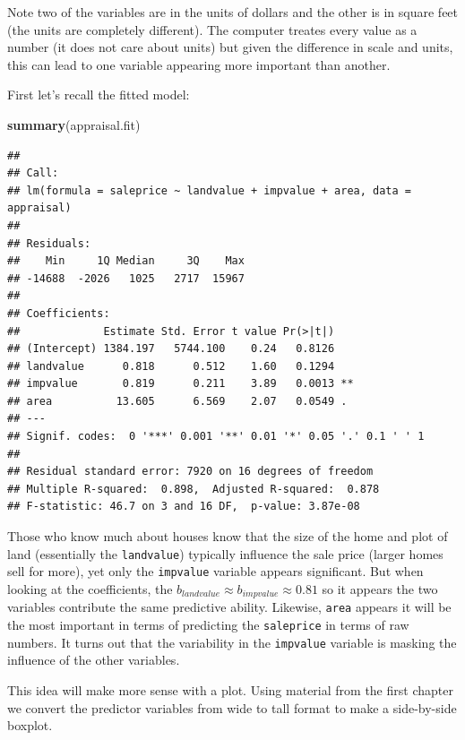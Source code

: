 \documentclass[
]{book}
\newenvironment{Shaded}{\begin{snugshade}}{\end{snugshade}}
\newcommand{\FunctionTok}[1]{\textcolor[rgb]{0.13,0.29,0.53}{\textbf{#1}}}
\newcommand{\NormalTok}[1]{#1}
\begin{document}
Note two of the variables are in the units of dollars and the other is in square feet (the units are completely different). The computer treates every value as a number (it does not care about units) but given the difference in scale and units, this can lead to one variable appearing more important than another.

First let's recall the fitted model:

\begin{Shaded}
\begin{Highlighting}[]
\FunctionTok{summary}\NormalTok{(appraisal.fit)}
\end{Highlighting}
\end{Shaded}

\begin{verbatim}
## 
## Call:
## lm(formula = saleprice ~ landvalue + impvalue + area, data = appraisal)
## 
## Residuals:
##    Min     1Q Median     3Q    Max 
## -14688  -2026   1025   2717  15967 
## 
## Coefficients:
##             Estimate Std. Error t value Pr(>|t|)   
## (Intercept) 1384.197   5744.100    0.24   0.8126   
## landvalue      0.818      0.512    1.60   0.1294   
## impvalue       0.819      0.211    3.89   0.0013 **
## area          13.605      6.569    2.07   0.0549 . 
## ---
## Signif. codes:  0 '***' 0.001 '**' 0.01 '*' 0.05 '.' 0.1 ' ' 1
## 
## Residual standard error: 7920 on 16 degrees of freedom
## Multiple R-squared:  0.898,  Adjusted R-squared:  0.878 
## F-statistic: 46.7 on 3 and 16 DF,  p-value: 3.87e-08
\end{verbatim}

Those who know much about houses know that the size of the home and plot of land (essentially the \texttt{landvalue}) typically influence the sale price (larger homes sell for more), yet only the \texttt{impvalue} variable appears significant. But when looking at the coefficients, the \(b_{landvalue} \approx b_{impvalue} \approx 0.81\) so it appears the two variables contribute the same predictive ability. Likewise, \texttt{area} appears it will be the most important in terms of predicting the \texttt{saleprice} in terms of raw numbers. It turns out that the variability in the \texttt{impvalue} variable is masking the influence of the other variables.

This idea will make more sense with a plot. Using material from the first chapter we convert the predictor variables from wide to tall format to make a side-by-side boxplot.
\end{document}
